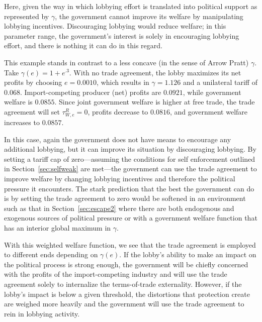 \documentclass[12pt]{article}
\newcommand{\ga}{\gamma}
\begin{document}
Here, given the way in which lobbying effort is translated into political support as represented by $\ga$, the government cannot improve its welfare by manipulating lobbying incentives. Discouraging lobbying would reduce welfare; in this parameter range, the government's interest is solely in encouraging lobbying effort, and there is nothing it can do in this regard.


This example stands in contrast to a less concave (in the sense of Arrow Pratt) $\ga$. Take $\ga(e) = 1 + e^{.3}$. With no trade agreement, the lobby maximizes its net profits by choosing $e=0.0010$, which results in $\ga=1.126$ and a unilateral tariff of $0.068$. Import-competing producer (net) profits are $0.0921$, while government welfare is $0.0855$. Since joint government welfare is higher at free trade, the trade agreement will set $\tau^R_{W,e}=0$, profits decrease to $0.0816$, and government welfare increases to $0.0857$.

In this case, again the government does not have means to encourage any additional lobbying, but it can improve its situation by discouraging lobbying. By setting a tariff cap of zero---assuming the conditions for self enforcement outlined in Section~\ref{sec:selfweak} are met---the government can use the trade agreement to improve welfare by changing lobbying incentives and therefore the political pressure it encounters. The stark prediction that the best the government can do is by setting the trade agreement to zero would be softened in an environment such as that in Section~\ref{sec:escape2} where there are both endogenous and exogenous sources of political pressure or with a government welfare function that has an interior global maximum in $\ga$.

With this weighted welfare function, we see that the trade agreement is employed to different ends depending on $\ga(e)$. If the lobby's ability to make an impact on the political process is strong enough, the government will be chiefly concerned with the profits of the import-competing industry and will use the trade agreement solely to internalize the terms-of-trade externality. However, if the lobby's impact is below a given threshold, the distortions that protection create are weighed more heavily and the government will use the trade agreement to rein in lobbying activity.
\end{document}
